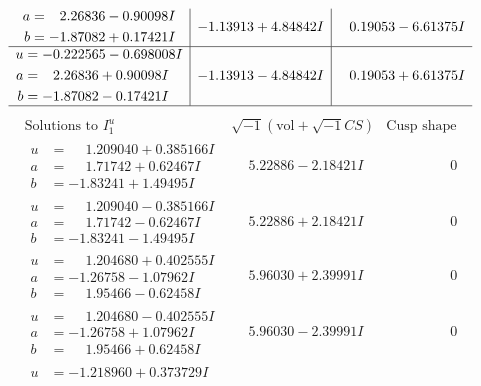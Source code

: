 \documentclass[1p]{elsarticle_modified}
\theoremstyle{definition}
\newcommand{\I}{\sqrt{-1}}
\begin{document}
$$\begin{array}{c|c|c}
\begin{aligned}
a &= \phantom{-}2.26836 - 0.90098 I \\
b &= -1.87082 + 0.17421 I\end{aligned}
 & -1.13913 + 4.84842 I & \phantom{-}0.19053 - 6.61375 I \\ \hline\begin{aligned}
u &= -0.222565 - 0.698008 I \\
a &= \phantom{-}2.26836 + 0.90098 I \\
b &= -1.87082 - 0.17421 I\end{aligned}
 & -1.13913 - 4.84842 I & \phantom{-}0.19053 + 6.61375 I\\
 \hline 
 \end{array}$$\newpage$$\begin{array}{c|c|c}  
\text{Solutions to }I^u_{1}& \I (\text{vol} + \sqrt{-1}CS) & \text{Cusp shape}\\
 \hline 
\begin{aligned}
u &= \phantom{-}1.209040 + 0.385166 I \\
a &= \phantom{-}1.71742 + 0.62467 I \\
b &= -1.83241 + 1.49495 I\end{aligned}
 & \phantom{-}5.22886 - 2.18421 I & \phantom{-0.000000 } 0 \\ \hline\begin{aligned}
u &= \phantom{-}1.209040 - 0.385166 I \\
a &= \phantom{-}1.71742 - 0.62467 I \\
b &= -1.83241 - 1.49495 I\end{aligned}
 & \phantom{-}5.22886 + 2.18421 I & \phantom{-0.000000 } 0 \\ \hline\begin{aligned}
u &= \phantom{-}1.204680 + 0.402555 I \\
a &= -1.26758 - 1.07962 I \\
b &= \phantom{-}1.95466 - 0.62458 I\end{aligned}
 & \phantom{-}5.96030 + 2.39991 I & \phantom{-0.000000 } 0 \\ \hline\begin{aligned}
u &= \phantom{-}1.204680 - 0.402555 I \\
a &= -1.26758 + 1.07962 I \\
b &= \phantom{-}1.95466 + 0.62458 I\end{aligned}
 & \phantom{-}5.96030 - 2.39991 I & \phantom{-0.000000 } 0 \\ \hline\begin{aligned}
u &= -1.218960 + 0.373729 I \\

\end{aligned}
\end{array}$$
\end{document}
